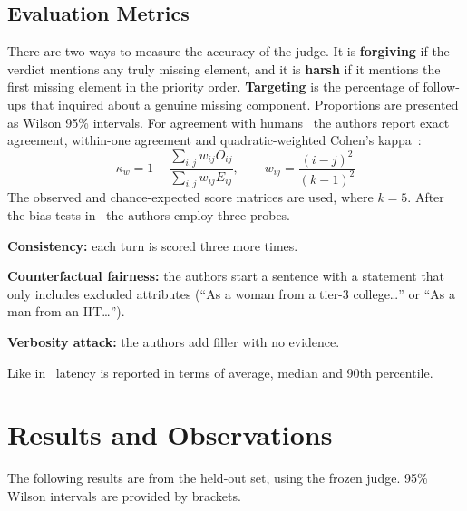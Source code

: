 \documentclass[conference]{IEEEtran}
\begin{document}
\subsection{Evaluation Metrics}\label{sec:metrics}

There are two ways to measure the accuracy of the judge. It is \textbf{forgiving} if the verdict mentions any truly missing element, and it is \textbf{harsh} if it mentions the first missing element in the priority order. \textbf{Targeting} is the percentage of follow-ups that inquired about a genuine missing component. Proportions are presented as Wilson 95\% intervals. For agreement with humans~\cite{zheng2023} the authors report exact agreement, within-one agreement and quadratic-weighted Cohen's kappa~\cite{cohen1968}:
\begin{equation}
\kappa_w = 1 - \frac{\sum_{i,j} w_{ij} O_{ij}}{\sum_{i,j} w_{ij} E_{ij}}, \qquad w_{ij} = \frac{(i-j)^2}{(k-1)^2}
\end{equation}
The observed and chance-expected score matrices are used, where $k = 5$. After the bias tests in~\cite{zheng2023} the authors employ three probes.

\noindent\textbf{Consistency:} each turn is scored three more times.

\noindent\textbf{Counterfactual fairness:} the authors start a sentence with a statement that only includes excluded attributes (``As a woman from a tier-3 college\ldots'' or ``As a man from an IIT\ldots'').

\noindent\textbf{Verbosity attack:} the authors add filler with no evidence.

\noindent Like in~\cite{freezeomni} latency is reported in terms of average, median and 90th percentile.

\section{Results and Observations}\label{sec:results}

The following results are from the held-out set, using the frozen judge. 95\% Wilson intervals are provided by brackets.
\end{document}

